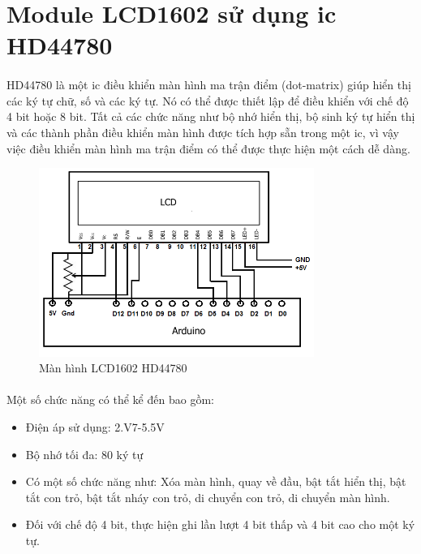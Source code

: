 \section{Module LCD1602 sử dụng ic HD44780}
\paragraph{}
HD44780 là một ic điều khiển màn hình ma trận điểm (dot-matrix) giúp hiển thị các ký tự chữ, số và các ký tự. Nó có thể được thiết lập để điều khiển với chế độ 4 bit hoặc 8 bit. Tất cả các chức năng như bộ nhớ hiển thị, bộ sinh ký tự hiển thị và các thành phần điều khiển màn hình được tích hợp sẵn trong một ic, vì vậy việc điều khiển màn hình ma trận điểm có thể được thực hiện một cách dễ dàng.

\begin{figure}[H]
    \centering
    \includegraphics[width=0.8\textwidth]{images/Arduino-HD44780-circuit-schematic.png}
    \caption{Màn hình LCD1602 HD44780}
    \label{fig:enter-label}
\end{figure}
\paragraph{}
Một số chức năng có thể kể đến bao gồm:
\begin{itemize}
    \item Điện áp sử dụng: 2.V7-5.5V
    \item Bộ nhớ tối đa: 80 ký tự
    \item Có một số chức năng như: Xóa màn hình, quay về đầu, bật tắt hiển thị, bật tắt con trỏ, bật tắt nháy con trỏ, di chuyển con trỏ, di chuyển màn hình.   
    \item Đối với chế độ 4 bit, thực hiện ghi lần lượt 4 bit thấp và 4 bit cao cho một ký tự.
\end{itemize}

